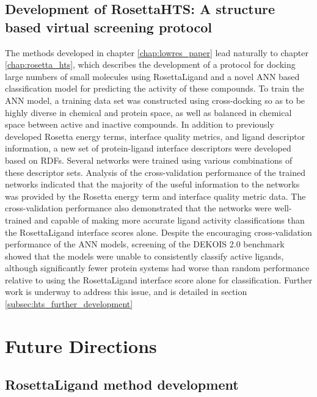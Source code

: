 \subsection{Development of RosettaHTS: A structure based virtual screening protocol}
The methods developed in chapter \ref{chap:lowres_paper} lead naturally to chapter \ref{chap:rosetta_hts}, which describes the development of a protocol for docking large numbers of small molecules using RosettaLigand and a novel \ac{ANN} based classification model for predicting the activity of these compounds.
To train the \ac{ANN} model, a training data set was constructed using cross-docking so as to be highly diverse in chemical and protein space, as well as balanced in chemical space between active and inactive compounds.
In addition to previously developed Rosetta energy terms, interface quality metrics, and ligand descriptor information, a new set of protein-ligand interface descriptors were developed based on \ac{RDF}s.
Several networks were trained using various combinations of these descriptor sets.
Analysis of the cross-validation performance of the trained networks indicated that the majority of the useful information to the networks was provided by the Rosetta energy term and interface quality metric data.
The cross-validation performance also demonstrated that the networks were well-trained and capable of making more accurate ligand activity classifications than the RosettaLigand interface scores alone. 
Despite the encouraging cross-validation performance of the \ac{ANN} models, screening of the DEKOIS 2.0 benchmark showed that the models were unable to consistently classify active ligands, although significantly fewer protein systems had worse than random performance relative to using the RosettaLigand interface score alone for classification.
Further work is underway to address this issue, and is detailed in section \ref{subsec:hts_further_development}

\section{Future Directions}

\subsection{RosettaLigand method development}

